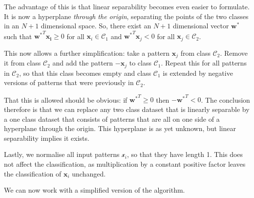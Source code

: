 The advantage of this is that linear separability becomes even easier to formulate. It is now a hyperplane \emph{through the origin}, separating the points of the two
classes in an $N+1$ dimensional space. So, there exist an $N+1$ dimensional vector $\boldsymbol{w}^{*}$ such that ${\boldsymbol{w}^*}^T\boldsymbol{x_i} \ge 0$ for all
$\boldsymbol{x}_i \in \mathcal{C}_1$ and ${\boldsymbol{w}^*}^T\boldsymbol{x}_j <0$ for all $\boldsymbol{x}_j \in \mathcal{C}_2$.

This now allows a further simplification: take a pattern $\boldsymbol{x}_j$ from class $\mathcal{C}_2$. Remove it from class $\mathcal{C}_2$ and add
the pattern $-\boldsymbol{x}_j$ to class $\mathcal{C}_1$. Repeat this for all patterns in $\mathcal{C}_2$, so that this class becomes empty and class $\mathcal{C}_1$
is extended by negative versions of patterns that were previously in $\mathcal{C}_2$.

That this is allowed should be obvious: if ${\boldsymbol{w}^*}^T\boldsymbol \ge 0$ then $-{\boldsymbol{w}^*}^T\boldsymbol < 0$. The conclusion therefore is
that we can replace any two class dataset that is linearly separable by a one class dataset that consists of patterns that are all on one side of a hyperplane
through the origin.  This hyperplane is as yet unknown, but linear separability implies it exists.

Lastly, we normalise all input patterns $\mathcal{x}_i$, so that they have length 1. This does not affect the classification, as multiplication
by a constant positive factor leaves the classification of $\boldsymbol{x}_i$ unchanged.


We can now work with a simplified version of the algorithm.

